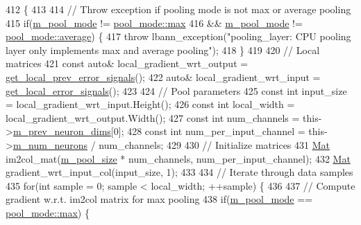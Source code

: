\begin{DoxyCode}
412                            \{
413 
414     \textcolor{comment}{// Throw exception if pooling mode is not max or average pooling}
415     \textcolor{keywordflow}{if}(\hyperlink{classlbann_1_1pooling__layer_a7b19407c88f89757e64ed3d4afab8443}{m\_pool\_mode} != \hyperlink{base_8hpp_ac47a6ee5278a53898222a48639a2bf39a2ffe4e77325d9a7152f7086ea7aa5114}{pool\_mode::max}
416         && \hyperlink{classlbann_1_1pooling__layer_a7b19407c88f89757e64ed3d4afab8443}{m\_pool\_mode} != \hyperlink{base_8hpp_ac47a6ee5278a53898222a48639a2bf39a6927a3a7218a3195858411433ec20a21}{pool\_mode::average}) \{
417       \textcolor{keywordflow}{throw} lbann\_exception(\textcolor{stringliteral}{"pooling\_layer: CPU pooling layer only implements max and average pooling"});
418     \}
419 
420     \textcolor{comment}{// Local matrices}
421     \textcolor{keyword}{const} \textcolor{keyword}{auto}& local\_gradient\_wrt\_output = \hyperlink{classlbann_1_1Layer_a82827edc5e869960144f3ccb2172bfcd}{get\_local\_prev\_error\_signals}();
422     \textcolor{keyword}{auto}& local\_gradient\_wrt\_input = \hyperlink{classlbann_1_1Layer_af178d00b9d878aa7d87754bff2a91f3a}{get\_local\_error\_signals}();
423 
424     \textcolor{comment}{// Pool parameters}
425     \textcolor{keyword}{const} \textcolor{keywordtype}{int} input\_size = local\_gradient\_wrt\_input.Height();
426     \textcolor{keyword}{const} \textcolor{keywordtype}{int} local\_width = local\_gradient\_wrt\_output.Width();
427     \textcolor{keyword}{const} \textcolor{keywordtype}{int} num\_channels = this->\hyperlink{classlbann_1_1Layer_ae204d1a2a79606eaa117273857ff62a3}{m\_prev\_neuron\_dims}[0];
428     \textcolor{keyword}{const} \textcolor{keywordtype}{int} num\_per\_input\_channel = this->\hyperlink{classlbann_1_1Layer_a6b5ebc8a7d9329d8a773ed787e7b41d8}{m\_num\_neurons} / num\_channels;
429 
430     \textcolor{comment}{// Initialize matrices}
431     \hyperlink{base_8hpp_a68f11fdc31b62516cb310831bbe54d73}{Mat} im2col\_mat(\hyperlink{classlbann_1_1pooling__layer_a8b3a9020bb896a1132c9823bc2c73515}{m\_pool\_size} * num\_channels, num\_per\_input\_channel);
432     \hyperlink{base_8hpp_a68f11fdc31b62516cb310831bbe54d73}{Mat} gradient\_wrt\_input\_col(input\_size, 1);
433 
434     \textcolor{comment}{// Iterate through data samples}
435     \textcolor{keywordflow}{for}(\textcolor{keywordtype}{int} sample = 0; sample < local\_width; ++sample) \{
436 
437       \textcolor{comment}{// Compute gradient w.r.t. im2col matrix for max pooling}
438       \textcolor{keywordflow}{if}(\hyperlink{classlbann_1_1pooling__layer_a7b19407c88f89757e64ed3d4afab8443}{m\_pool\_mode} == \hyperlink{base_8hpp_ac47a6ee5278a53898222a48639a2bf39a2ffe4e77325d9a7152f7086ea7aa5114}{pool\_mode::max}) \{

\end{DoxyCode}
